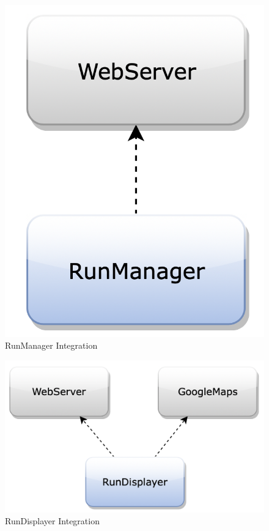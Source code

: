 \begin{figure}[H]
\begin{center}
\begin{minipage}[c]{.40\textwidth}
\includegraphics[scale=0.35,valign=t]{Images/IntegrationPlanImages/fig13.png}
\vspace{0.3cm}
\caption{RunManager Integration}
        \end{minipage}
      \end{center}
      \vspace{0.8cm}
\end{figure}

\begin{figure}[H]
\centering
\includegraphics[scale=0.42]{Images/IntegrationPlanImages/fig14.png}
\caption{RunDisplayer Integration}
\end{figure}

